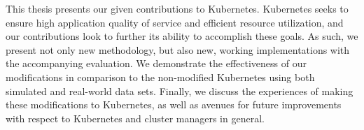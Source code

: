 This thesis presents our given contributions to Kubernetes. Kubernetes seeks to
ensure high application quality of service and efficient resource utilization,
and our contributions look to further its ability to accomplish these
goals. As such, we present not only new methodology, but also new, working
implementations with the accompanying evaluation. We demonstrate the effectiveness
of our modifications in comparison to the non-modified Kubernetes using both
simulated and real-world data sets. Finally, we
discuss the experiences of making these modifications to Kubernetes, as well as
avenues for future improvements with respect to Kubernetes and cluster managers in
general.

